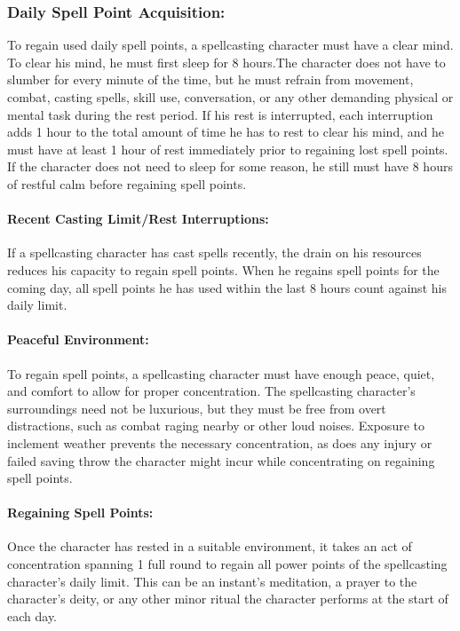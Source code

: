 \documentclass[../VancianToPsionics.tex]{subfiles}
\begin{document}
\subsubsection{Daily Spell Point Acquisition:}
\label{sec:DailySpellPointAcquisition}
To regain used daily spell points, a spellcasting character must have a clear mind. To clear his mind, he must first sleep for 8 hours.The character does not have to slumber for every minute of the time, but he must refrain from movement, combat, casting spells, skill use, conversation, or any other demanding physical or mental task during the rest period. If his rest is interrupted, each interruption adds 1 hour to the total amount of time he has to rest to clear his mind, and he must have at least 1 hour of rest immediately prior to regaining lost spell points. If the character does not need to sleep for some reason, he still must have 8 hours of restful calm before regaining spell points.

\paragraph{Recent Casting Limit/Rest Interruptions:} If a spellcasting character has cast spells recently, the drain on his resources reduces his capacity to regain spell points. When he regains spell points for the coming day, all spell points he has used within the last 8 hours count against his daily limit.

\paragraph{Peaceful Environment:} To regain spell points, a spellcasting character must have enough peace, quiet, and comfort to allow for proper concentration. The spellcasting character's surroundings need not be luxurious, but they must be free from overt distractions, such as combat raging nearby or other loud noises. Exposure to inclement weather prevents the necessary concentration, as does any injury or failed saving throw the character might incur while concentrating on regaining spell points.

\paragraph{Regaining Spell Points:} Once the character has rested in a suitable environment, it takes an act of concentration spanning 1 full round to regain all power points of the spellcasting character's daily limit. This can be an instant's meditation, a prayer to the character's deity, or any other minor ritual the character performs at the start of each day.
\end{document}
